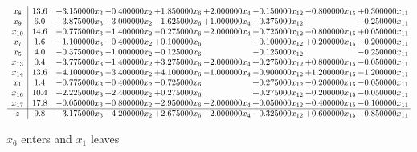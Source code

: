 \documentclass[10pt]{article}
\begin{document}
 \[\begin{array}{c| c c@{\hskip 2pt} c@{\hskip 2pt} c@{\hskip 2pt} c@{\hskip 2pt} c@{\hskip 2pt} c@{\hskip 2pt} c@{\hskip 2pt} }
 x_{8}   &  13.6 & + 3.150000 x_{3} & -0.400000 x_{2} & + 1.850000 x_{6} & + 2.000000 x_{4} & -0.150000 x_{12} & -0.800000 x_{15} & + 0.300000 x_{11}\\
 x_{9}   &  6.0 & -3.875000 x_{3} & + 3.000000 x_{2} & -1.625000 x_{6} & + 1.000000 x_{4} & + 0.375000 x_{12} &   & -0.250000 x_{11}\\
 x_{10}   &  14.6 & + 0.775000 x_{3} & -1.400000 x_{2} & -0.275000 x_{6} & -2.000000 x_{4} & + 0.725000 x_{12} & -0.800000 x_{15} & + 0.050000 x_{11}\\
 x_{7}   &  1.6 & -1.100000 x_{3} & -0.400000 x_{2} & + 0.100000 x_{6} &   & + 0.100000 x_{12} & + 0.200000 x_{15} & -0.200000 x_{11}\\
 x_{5}   &  4.0 & -0.375000 x_{3} & -1.000000 x_{2} & -0.125000 x_{6} &   & -0.125000 x_{12} &   & -0.250000 x_{11}\\
 x_{13}   &  0.4 & -3.775000 x_{3} & + 1.400000 x_{2} & + 3.275000 x_{6} & -2.000000 x_{4} & + 0.275000 x_{12} & + 0.800000 x_{15} & -0.050000 x_{11}\\
 x_{14}   &  13.6 & -4.100000 x_{3} & -3.400000 x_{2} & + 4.100000 x_{6} & -1.000000 x_{4} & -0.900000 x_{12} & + 1.200000 x_{15} & -1.200000 x_{11}\\
 x_{1}   &  1.4 & -0.775000 x_{3} & + 0.400000 x_{2} & -0.725000 x_{6} &   & + 0.275000 x_{12} & -0.200000 x_{15} & -0.050000 x_{11}\\
 x_{16}   &  10.4 & + 2.225000 x_{3} & + 2.400000 x_{2} & + 0.275000 x_{6} &   & + 0.275000 x_{12} & -0.200000 x_{15} & -0.050000 x_{11}\\
 x_{17}   &  17.8 & -0.050000 x_{3} & + 0.800000 x_{2} & -2.950000 x_{6} & -2.000000 x_{4} & + 0.050000 x_{12} & -0.400000 x_{15} & -0.100000 x_{11}\\
\hline
z    &  9.8 & -3.175000 x_{3} & -4.200000 x_{2} & + 2.675000 x_{6} & -2.000000 x_{4} & -0.325000 x_{12} & + 0.600000 x_{15} & -0.850000 x_{11}\\
\end{array}\]


 $ x_{6} $ enters and $ x_{1} $ leaves 
\end{document}
